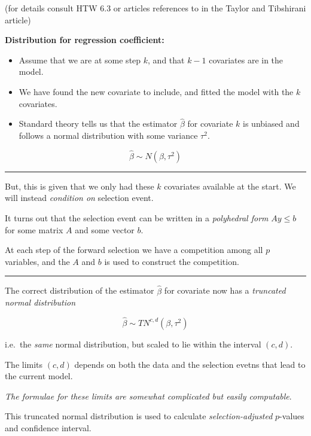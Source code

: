 \documentclass[
  letterpaper,
  DIV=11,
  numbers=noendperiod]{scrartcl}
\providecommand{\tightlist}{%
  \setlength{\itemsep}{0pt}\setlength{\parskip}{0pt}}\usepackage{longtable,booktabs,array}
\begin{document}
(for details consult HTW 6.3 or articles references to in the Taylor and
Tibshirani article)

\textbf{Distribution for regression coefficient:}

\begin{itemize}
\tightlist
\item
  Assume that we are at some step \(k\), and that \(k-1\) covariates are
  in the model.
\item
  We have found the new covariate to include, and fitted the model with
  the \(k\) covariates.
\item
  Standard theory tells us that the estimator \(\hat{\beta}\) for
  covariate \(k\) is unbiased and follows a normal distribution with
  some variance \(\tau^2\).
\end{itemize}

\[ \hat{\beta} \sim N(\beta,\tau^2)\]

\begin{center}\rule{0.5\linewidth}{0.5pt}\end{center}

But, this is given that we only had these \(k\) covariates available at
the start. We will instead \emph{condition on} selection event.

It turns out that the selection event can be written in a
\emph{polyhedral form} \(A y \le b\) for some matrix \(A\) and some
vector \(b\).

At each step of the forward selection we have a competition among all
\(p\) variables, and the \(A\) and \(b\) is used to construct the
competition.

\begin{center}\rule{0.5\linewidth}{0.5pt}\end{center}

The correct distribution of the estimator \(\hat{\beta}\) for covariate
now has a \emph{truncated normal distribution}

\[ \hat{\beta} \sim TN^{c,d}(\beta,\tau^2)\]

i.e.~the \emph{same} normal distribution, but scaled to lie within the
interval \((c,d)\).

The limits \((c,d)\) depends on both the data and the selection evetns
that lead to the current model.

\emph{The formulae for these limits are somewhat complicated but easily
computable}.

This truncated normal distribution is used to calculate
\emph{selection-adjusted} \(p\)-values and confidence interval.
\end{document}
